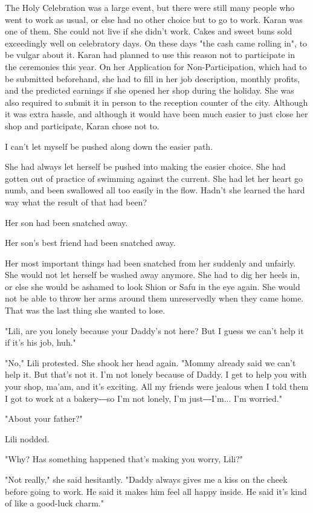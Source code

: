 The Holy Celebration was a large event, but there were still many people
who went to work as usual, or else had no other choice but to go to
work. Karan was one of them. She could not live if she didn't work.
Cakes and sweet buns sold exceedingly well on celebratory days. On these
days "the cash came rolling in", to be vulgar about it. Karan had
planned to use this reason not to participate in the ceremonies this
year. On her Application for Non-Participation, which had to be
submitted beforehand, she had to fill in her job description, monthly
profits, and the predicted earnings if she opened her shop during the
holiday. She was also required to submit it in person to the reception
counter of the city. Although it was extra hassle, and although it would
have been much easier to just close her shop and participate, Karan
chose not to.

I can't let myself be pushed along down the easier path.

She had always let herself be pushed into making the easier choice. She
had gotten out of practice of swimming against the current. She had let
her heart go numb, and been swallowed all too easily in the flow. Hadn't
she learned the hard way what the result of that had been?

Her son had been snatched away.

Her son's best friend had been snatched away.

Her most important things had been snatched from her suddenly and
unfairly. She would not let herself be washed away anymore. She had to
dig her heels in, or else she would be ashamed to look Shion or Safu in
the eye again. She would not be able to throw her arms around them
unreservedly when they came home. That was the last thing she wanted to
lose.

"Lili, are you lonely because your Daddy's not here? But I guess we
can't help it if it's his job, huh."

"No," Lili protested. She shook her head again. "Mommy already said we
can't help it. But that's not it. I'm not lonely because of Daddy. I get
to help you with your shop, ma'am, and it's exciting. All my friends
were jealous when I told them I got to work at a bakery―so I'm not
lonely, I'm just―I'm... I'm worried."

"About your father?"

Lili nodded.

"Why? Has something happened that's making you worry, Lili?"

"Not really," she said hesitantly. "Daddy always gives me a kiss on the
cheek before going to work. He said it makes him feel all happy inside.
He said it's kind of like a good-luck charm."

